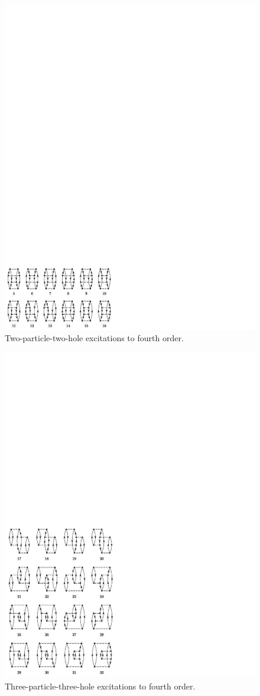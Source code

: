 \documentclass[%
twoside,                 %
final,                   %
10pt]{article}
\newenvironment{doconceexercise}{}{}
\begin{document}
\begin{doconceexercise}
\begin{figure}[t]
  \centerline{\includegraphics[width=0.6\linewidth]{fig-proj/2p2h.pdf}}
  \caption{
  Two-particle-two-hole excitations to fourth order. \label{fig:fourthorder2p2h}
  }
\end{figure}



\begin{figure}[t]
  \centerline{\includegraphics[width=0.6\linewidth]{fig-proj/3p3h.pdf}}
  \caption{
  Three-particle-three-hole excitations to fourth order. \label{fig:fourthorder3p3h}
  }
\end{figure}




\end{doconceexercise}
\end{document}
